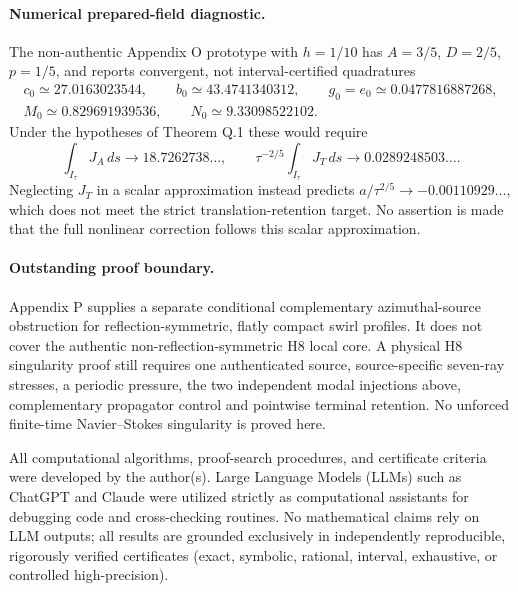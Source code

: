 \paragraph{Numerical prepared-field diagnostic.}
The non-authentic Appendix O prototype with $h=1/10$
has $A=3/5$, $D=2/5$, $p=1/5$, and reports convergent,
not interval-certified quadratures
\[
 \begin{gathered}
 c_0\simeq27.0163023544,\qquad
 b_0\simeq43.4741340312,\qquad
 g_0=e_0\simeq0.0477816887268,\\
 M_0\simeq0.829691939536,\qquad
 N_0\simeq9.33098522102.
 \end{gathered}
\]
Under the hypotheses of Theorem Q.1 these would require
\[
 \int_{I_\tau}J_A\,ds\longrightarrow18.7262738\ldots,\qquad
 \tau^{-2/5}\int_{I_\tau}J_T\,ds
 \longrightarrow0.0289248503\ldots .
\]
Neglecting $J_T$ in a scalar approximation instead predicts
$a/\tau^{2/5}\to-0.00110929\ldots$,
which does not meet the strict translation-retention target.
No assertion is made that the full nonlinear correction follows
this scalar approximation.

\paragraph{Outstanding proof boundary.}
Appendix P supplies a separate conditional complementary
azimuthal-source obstruction for reflection-symmetric, flatly
compact swirl profiles. It does not cover the authentic
non-reflection-symmetric H8 local core.
A physical H8 singularity proof still requires one authenticated
source, source-specific seven-ray stresses, a periodic pressure,
the two independent modal injections above, complementary
propagator control and pointwise terminal retention.
No unforced finite-time Navier--Stokes singularity is proved here.

\medskip\noindent All computational algorithms, proof-search procedures, and certificate criteria were developed by the author(s). Large Language Models (LLMs) such as ChatGPT and Claude were utilized strictly as computational assistants for debugging code and cross-checking routines. No mathematical claims rely on LLM outputs; all results are grounded exclusively in independently reproducible, rigorously verified certificates (exact, symbolic, rational, interval, exhaustive, or controlled high-precision).
